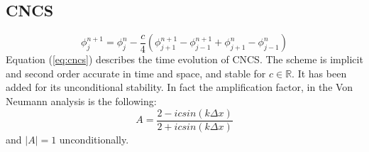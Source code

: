 \subsection{CNCS}
\begin{equation}
\phi_j^{n+1}=\phi_j^{n}-\frac{c}{4}(\phi_{j+1}^{n+1}-\phi_{j-1}^{n+1}+\phi_{j+1}^{n}-\phi_{j-1}^{n})
\label{eq:cncs}
\end{equation}
Equation (\ref{eq:cncs}) describes the time evolution of CNCS. The scheme is implicit and second order accurate in time and space, and stable for $c\in\mathbb{R}$. It has been added for its unconditional stability. In fact the amplification factor, in the Von Neumann analysis is the following:
\begin{equation}
\label{eq:cncs_vonneumann}
A=\frac{2-icsin(k\Delta x)}{2+icsin(k\Delta x)}
\end{equation}
and $|A|=1$ unconditionally.

